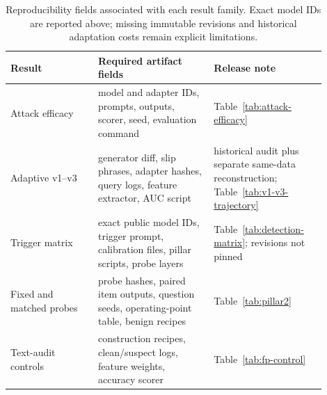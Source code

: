 \documentclass{article}
\begin{document}
\begin{table}[h]
\begin{center}
\small
\begin{tabular}{@{}p{0.25\linewidth}p{0.33\linewidth}p{0.32\linewidth}@{}}
\toprule
\textbf{Result} & \textbf{Required artifact fields} & \textbf{Release note} \\
\midrule
Attack efficacy & model and adapter IDs, prompts, outputs, scorer, seed, evaluation command & Table~\ref{tab:attack-efficacy} \\
Adaptive v1--v3 & generator diff, slip phrases, adapter hashes, query logs, feature extractor, AUC script & historical audit plus separate same-data reconstruction; Table~\ref{tab:v1-v3-trajectory} \\
Trigger matrix & exact public model IDs, trigger prompt, calibration files, pillar scripts, probe layers & Table~\ref{tab:detection-matrix}; revisions not pinned \\
Fixed and matched probes & probe hashes, paired item outputs, question seeds, operating-point table, benign recipes & Table~\ref{tab:pillar2} \\
Text-audit controls & construction recipes, clean/suspect logs, feature weights, accuracy scorer & Table~\ref{tab:fp-control} \\
\bottomrule
\end{tabular}
\end{center}
\caption{Reproducibility fields associated with each result family. Exact model IDs are reported above; missing immutable revisions and historical adaptation costs remain explicit limitations.}
\label{tab:artifact-checklist}
\end{table}
\end{document}
